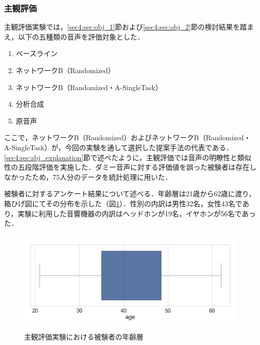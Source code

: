 \clearpage

\subsubsection{主観評価}
主観評価実験では，\ref{sec4:sec:obj_1}節および\ref{sec4:sec:obj_2}節の検討結果を踏まえ，以下の五種類の音声を評価対象とした．
\begin{enumerate}
    \item ベースライン
    \item ネットワークB（Randomized）
    \item ネットワークB（Randomized・A-SingleTask）
    \item 分析合成
    \item 原音声
\end{enumerate}
ここで，ネットワークB（Randomized）およびネットワークB（Randomized・A-SingleTask）が，今回の実験を通して選択した提案手法の代表である．\ref{sec4:sec:sbj_explanation}節で述べたように，主観評価では音声の明瞭性と類似性の五段階評価を実施した．ダミー音声に対する評価値を誤った被験者は存在しなかったため，75人分のデータを統計処理に用いた．

被験者に対するアンケート結果について述べる．年齢層は21歳から62歳に渡り，箱ひげ図にてその分布を示した（図\ref{sec4:fig:age}）．性別の内訳は男性32名，女性43名であり，実験に利用した音響機器の内訳はヘッドホンが19名，イヤホンが56名であった．
\begin{figure}[b]
    \centering
    \includegraphics[height=50mm]{./figure/sec4/sbj/age.png}
    \caption{主観評価実験における被験者の年齢層}
    \label{sec4:fig:age}
\end{figure}

